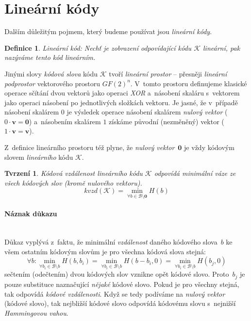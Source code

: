 \documentclass[thesis=M,czech,hidelinks]{FITthesis}[2012/06/26]
\newcommand{\0}{{\textcolor[gray]{0.75}{0}}}
\newtheorem{tvrzeni}{Tvrzení}
\newtheorem{definice}{Definice}
\begin{document}
\section{Lineární kódy}\label{app_linearni_kody}

Dalším důležitým pojmem, který budeme používat jsou \emph{lineární kódy}.

\begin{definice}{Lineární kód:}
    Nechť je zobrazení odpovídající kódu $\mathcal{K}$ \emph{lineární},
    pak nazýváme tento kód \emph{lineárním}.
\end{definice}

Jinými slovy \emph{kódová slova} kódu $\mathcal{K}$ tvoří \emph{lineární
prostor} -- přesněji \emph{lineární podprostor} vektorového prostoru $GF(2)^n$.
V~tomto prostoru definujeme klasické operace sčítání dvou vektorů jako operaci
\emph{XOR} a~násobení skaláru s~vektorem jako operaci násobení po jednotlivých
složkách vektoru. Je jasné, že v~případě násobení skalárem $0$ je výsledek
operace násobení skalárem \emph{nulový vektor} ($0 \cdot \mathbf{v} = \mathbf{0}$)
a~násobením skalárem $1$ získáme původní (nezměněný) vektor
($1 \cdot \mathbf{v} = \mathbf{v}$).

Z~definice lineárního prostoru též plyne, že \emph{nulový vektor}~$\mathbf{0}$
je vždy kódovým slovem \emph{lineárního} kódu $\mathcal{K}$.

\begin{tvrzeni}
    Kódová vzdálenost lineárního kódu $\mathcal{K}$ odpovídá minimální váze ze
    všech kódových slov (kromě nulového vektoru).
    $$
        kvzd(\mathcal{K}) =
        \min_{\forall b \in \mathcal{B} \setminus \mathbf{0}} H(b)
    $$
\end{tvrzeni}


\paragraph{Náznak důkazu} \hfil \\
Důkaz vyplývá z~faktu, že minimální \emph{vzdálenost} daného kódového slova~$b$
ke všem ostatním kódovým slovům je pro všechna kódová slova stejná:
$$
    \forall b :
    \min_{\forall b_i \in \mathcal{B} \setminus b} H( b,     b_i ) =
    \min_{\forall b_i \in \mathcal{B} \setminus b} H( b-b_i, 0   ) =
    \min_{\forall b_i \in \mathcal{B} \setminus b} H( b_j,   0   )
$$
sečtením (odečtením) dvou kódových slov vznikne opět kódové slovo. Proto~$b_j$
je pouze substituce naznačující \emph{nějaké} kódové slovo. Pokud je pro všechny
stejná, tak odpovídá \emph{kódové vzdálenosti}. Když se tedy podíváme na
\emph{nulový vektor} (kódové slovo), tak nejbližší kódové slovo odpovídá
kódovému slovu s~nejnižší \emph{Hammingovou vahou}.
\end{document}

